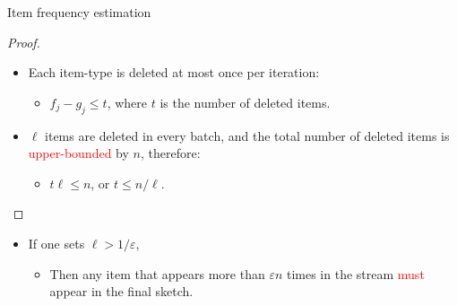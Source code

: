 \documentclass[first=dgreen,second=purple,logo=redque]{aaltoslides}
\begin{document}
\begin{frame}[allowframebreaks=1]{Item frequency estimation}
\begin{proof}
\begin{itemize}
   \item Each item-type is deleted \textcolor{dgreen}{at most} once per iteration:
   \begin{itemize} \item $f_{j} - g_{j} \leq t$, where $t$ is the
   number of deleted items.\end{itemize}



   \item $\ell$ items are deleted in every batch, and the total number of
   deleted items is \textcolor{red}{upper-bounded} by $n$, therefore:
   \begin{itemize} \item $t\ell \leq n$, or $t \leq n/\ell$\cite{Misra82}.\end{itemize} 
\end{itemize}
\end{proof}
\begin{itemize}
  \item If one sets $\ell > 1/\varepsilon$,
  \begin{itemize} \item Then any item that appears \textcolor{dgreen}{more than}
  $\varepsilon n$ times in the stream \textcolor{red}{must} appear in
  the final sketch.\end{itemize}
\end{itemize}
  
\end{frame}
\end{document}
